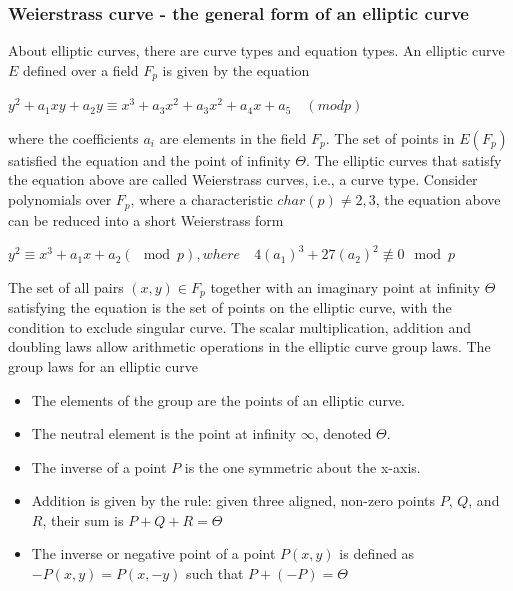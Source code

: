 \subsubsection{Weierstrass curve - the general form of an elliptic curve}
About elliptic curves, there are curve types and equation types. An elliptic curve $E$ defined over a field $F_p$ is given by the equation\\
\hspace{0.5cm}
\begin{center}
$y^2 + a_1xy + a_2y \equiv x^3 + a_3x^2 + a_3x^2 + a_4x + a_5 \quad (mod p)$\\
\end{center}
\hspace{0.5cm}
where the coefficients $a_i$ are elements in the field $F_p$. The set of points in $E(F_p)$ satisfied the equation and the point of infinity $\Theta$. The elliptic curves that satisfy the equation above are called Weierstrass curves, i.e., a curve type. Consider polynomials over $F_p$, where a characteristic $char(p) \neq 2,3$, the equation above can be reduced into a short Weierstrass form\\
\hspace{0.5cm}
\begin{center}
$y^2 \equiv x^3 + a_1x + a_2 (\mod p), where \quad 4(a_1)^3 + 27(a_2)^2 \not\equiv 0 \mod p$ 
\end{center}
\hspace{0.5cm}
The set of all pairs $(x,y) \in F_p$ together with an imaginary point at infinity $\Theta$ satisfying the equation is the set of points on the elliptic curve, with the condition to exclude singular curve. The scalar multiplication, addition and doubling laws allow arithmetic operations in the elliptic curve group laws. The group laws for an elliptic curve
\begin{itemize}
\item The elements of the group are the points of an elliptic curve.\\
\item The neutral element is the point at infinity $\infty$, denoted $\Theta$.\\
\item The inverse of a point $P$ is the one symmetric about the x-axis.\\
\item Addition is given by the rule: given three aligned, non-zero points $P$, $Q$, and $R$, their sum is $P + Q + R = \Theta$
\item The inverse or negative point of a point $P(x,y)$ is defined as $-P(x,y) = P(x,-y)$ such that $P + (-P) = \Theta$
\end{itemize}

